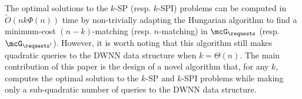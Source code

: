 

  
 



The optimal solutions to the $k$-SP (resp. $k$-SPI) problems can be computed in $\tilde{O}(nk\Phi(n))$ time by non-trivially adapting the Hungarian algorithm to find a minimum-cost $(n-k)$-matching (resp. $n$-matching) in $\mcG_{\requests}$ (resp. $\mcG_{\requests'}$). 
However, it is worth noting that this algorithm still makes quadratic queries to the DWNN data structure when $k = \Theta(n)$. The main contribution of this paper is the design of a novel algorithm that, for any $k$, computes the optimal solution to the $k$-SP and $k$-SPI problems while making only a sub-quadratic number of queries to the DWNN data structure. 


